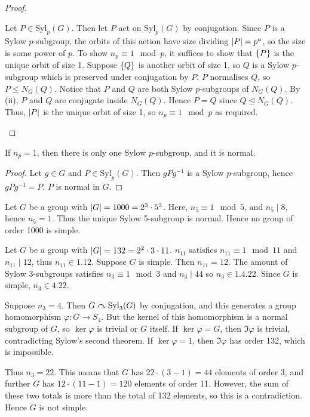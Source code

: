 \begin{proof}
\begin{enumerate}[(i)]
			Let \( P \in \mathrm{Syl}_p(G) \).
			Then let \( P \) act on \( \mathrm{Syl}_p(G) \) by conjugation.
			Since \( P \) is a Sylow \( p \)-subgroup, the orbits of this action have size dividing \( \abs{P} = p^a \), so the size is some power of \( p \).
			To show \( n_p \equiv 1 \mod p \), it suffices to show that \( \qty{P} \) is the unique orbit of size 1.
			Suppose \( \qty{Q} \) is another orbit of size 1, so \( Q \) is a Sylow \( p \)-subgroup which is preserved under conjugation by \( P \).
			\( P \) normalises \( Q \), so \( P \leq N_G(Q) \).
			Notice that \( P \) and \( Q \) are both Sylow \( p \)-subgroups of \( N_G(Q) \).
			By (ii), \( P \) and \( Q \) are conjugate inside \( N_G(Q) \).
			Hence \( P = Q \) since \( Q \trianglelefteq N_G(Q) \).
			Thus, \( \abs{P} \) is the unique orbit of size 1, so \( n_p \equiv 1 \mod p \) as required.
	\end{enumerate}
\end{proof}
\begin{corollary}
	If \( n_p = 1 \), then there is only one Sylow \( p \)-subgroup, and it is normal.
\end{corollary}
\begin{proof}
	Let \( g \in G \) and \( P \in \mathrm{Syl}_p(G) \).
	Then \( g P g^{-1} \) is a Sylow \( p \)-subgroup, hence \( g P g^{-1} = P \).
	\( P \) is normal in \( G \).
\end{proof}
\begin{example}
	Let \( G \) be a group with \( \abs{G} = 1000 = 2^3 \cdot 5^3 \).
	Here, \( n_5 \equiv 1 \mod 5 \), and \( n_5 \mid 8 \), hence \( n_5 = 1 \).
	Thus the unique Sylow 5-subgroup is normal.
	Hence no group of order 1000 is simple.
\end{example}
\begin{example}
	Let \( G \) be a group with \( \abs{G} = 132 = 2^2 \cdot 3 \cdot 11 \).
	\( n_{11} \) satisfies \( n_{11} \equiv 1 \mod 11 \) and \( n_{11} \mid 12 \), thus \( n_{11} \in \qty{1, 12} \).
	Suppose \( G \) is simple.
	Then \( n_{11} = 12 \).
	The amount of Sylow 3-subgroups satisfies \( n_3 \equiv 1 \mod 3 \) and \( n_3 \mid 44 \) so \( n_3 \in \qty{1, 4, 22} \).
	Since \( G \) is simple, \( n_3 \in \qty{4, 22} \).

	Suppose \( n_3 = 4 \).
	Then \( G \curvearrowright \mathrm{Syl}_3(G) \) by conjugation, and this generates a group homomorphism \( \varphi \colon G \to S_4 \).
	But the kernel of this homomorphism is a normal subgroup of \( G \), so \( \ker \varphi \) is trivial or \( G \) itself.
	If \( \ker \varphi = G \), then \( \Im \varphi \) is trivial, contradicting Sylow's second theorem.
	If \( \ker \varphi = 1 \), then \( \Im \varphi \) has order 132, which is impossible.

	Thus \( n_3 = 22 \).
	This means that \( G \) has \( 22 \cdot (3-1) = 44 \) elements of order 3, and further \( G \) has \( 12 \cdot (11 - 1) = 120 \) elements of order 11.
	However, the sum of these two totals is more than the total of 132 elements, so this is a contradiction.
	Hence \( G \) is not simple.
\end{example}
